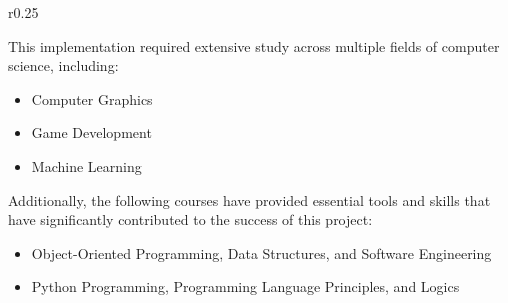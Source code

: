 




\begin{wrapfigure}{r}{0.25\textwidth} %
    \centering
\end{wrapfigure}

This implementation required extensive study across multiple fields of computer science, including:

\begin{itemize}
\item Computer Graphics
\item Game Development
\item Machine Learning
\end{itemize}


Additionally, the following courses have provided essential tools and skills that have significantly contributed to the success of this project:


\begin{itemize}
\item Object-Oriented Programming, Data Structures, and Software Engineering
\item Python Programming, Programming Language Principles, and Logics
\end{itemize}



































